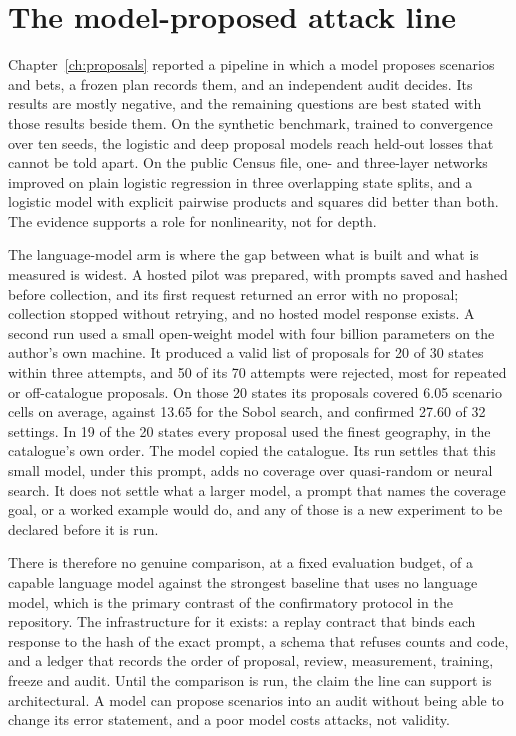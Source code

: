 \section{The model-proposed attack line}

Chapter~\ref{ch:proposals} reported a pipeline in which a model proposes scenarios and
bets, a frozen plan records them, and an independent audit decides. Its results are
mostly negative, and the remaining questions are best stated with those results
beside them. On the synthetic benchmark, trained to convergence over ten seeds, the
logistic and deep proposal models reach held-out losses that cannot be told apart.
On the public Census file, one- and three-layer networks improved on plain logistic
regression in three overlapping state splits, and a logistic model with explicit
pairwise products and squares did better than both.
The evidence supports a role for nonlinearity, not for depth.

The language-model arm is where the gap between what is built and what is measured is
widest. A hosted pilot was prepared, with prompts saved and hashed before collection,
and its first request returned an error with no proposal; collection stopped without
retrying, and no hosted model response exists.
A second run used a small open-weight model with four billion parameters on the
author's own machine. It produced a valid list of proposals for 20 of 30 states within
three attempts, and 50 of its 70 attempts were rejected, most for repeated or
off-catalogue proposals. On those 20 states its proposals covered 6.05 scenario cells
on average, against 13.65 for the Sobol search, and confirmed 27.60 of 32 settings. In
19 of the 20 states every proposal used the finest geography, in the catalogue's own
order. %
The model copied the catalogue. Its run settles that this small model, under this
prompt, adds no coverage over quasi-random or neural search. It does not settle what a
larger model, a prompt that names the coverage goal, or a worked example would do, and
any of those is a new experiment to be declared before it is run.

There is therefore no genuine comparison, at a fixed evaluation budget, of a
capable language model against the strongest baseline that uses no language model, which is the
primary contrast of the confirmatory protocol in the repository.
The infrastructure for it exists: a replay contract that binds each response to the
hash of the exact prompt, a schema that refuses counts and code, and a ledger that
records the order of proposal, review, measurement, training, freeze and audit. Until
the comparison is run, the claim the line can support is architectural. A model can
propose scenarios into an audit without being able to change its error statement, and
a poor model costs attacks, not validity.

